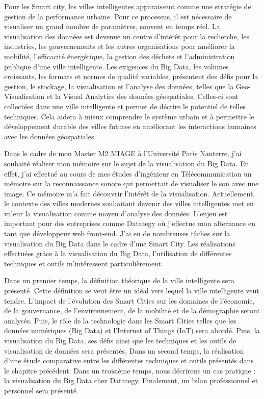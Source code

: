 \documentclass[french, a4paper, 12pt]{report}
\begin{document}
Pour les Smart city, les villes intelligentes apparaissent comme une stratégie de gestion de la performance urbaine. Pour ce processus, il est nécessaire de visualiser un grand nombre de paramètres, souvent en temps réel. 
La visualisation des données est devenue un centre d'intérêt pour la recherche, les industries, les gouvernements et les autres organisations pour améliorer la mobilité, l'efficacité énergétique, la gestion des déchets et l'administration publique d'une ville intelligente. Les exigences du Big Data, les volumes croissants, les formats et normes de qualité variables, présentent des défis pour la gestion, le stockage, la visualisation et l'analyse des données, telles que la Geo-Visualisation et la Visual Analytics des données géospatiales. Celles-ci sont collectées dans une ville intelligente et permet de décrire le potentiel de telles techniques. Cela aidera à mieux comprendre le système urbain et à permettre le développement durable des villes futures en améliorant les interactions humaines avec les données géospatiales.

Dans le cadre de mon Master M2 MIAGE à l’Université Paris Nanterre, j’ai souhaité réaliser mon mémoire sur le sujet de la visualisation du Big Data. 
En effet, j’ai effectué au cours de mes études d’ingénieur en Télécommunication un mémoire sur la reconnaissance sonore qui permettait de visualiser le son avec une image. Ce mémoire m’a fait découvrir l’intérêt de la visualisation. 
Actuellement, le contexte des villes modernes souhaitant devenir des villes intelligentes met en valeur la visualisation comme moyen d’analyse des données. L’enjeu est important pour des entreprises comme Datategy où j’effectue mon alternance en tant que développeur web front-end. J’ai eu de nombreuses tâches sur la visualisation du Big Data dans le cadre d’une Smart City. Les réalisations effectuées grâce à la visualisation du Big Data, l’utilisation de différentes techniques  et outils m’intéressent particulièrement. 

Dans un premier temps, la définition théorique de la ville intelligente sera présenté. Cette définition se veut être un idéal vers lequel la ville intelligente veut tendre. L’impact de l'évolution des Smart Cities sur les domaines de l’économie, de la gouvernance, de l’environnement, de la mobilité et de la démographie seront analysés. Puis, le rôle de la technologie dans les Smart Cities telles que les données numériques (Big Data) et l’Internet of Things (IoT) sera abordé. Puis, la visualisation du Big Data, ses défis ainsi que les techniques et les outils de visualisation de données sera présentés. 
Dans un second temps, la réalisation d’une étude comparative entre les différentes techniques et outils présentés dans le chapitre précédent. 
Dans un troisième temps, nous décrirons un cas pratique :  la visualisation du Big Data chez Datategy. 
Finalement, un bilan professionnel et personnel sera présenté. 
\end{document}
